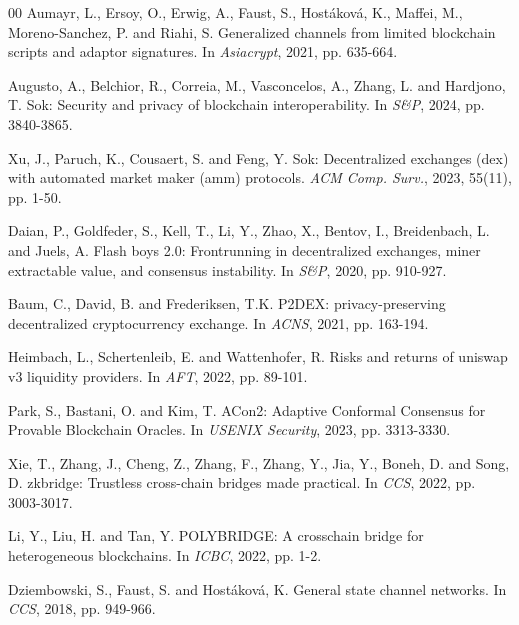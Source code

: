 \documentclass[runningheads]{llncs}
\begin{document}
\begin{thebibliography}{00}
Aumayr, L., Ersoy, O., Erwig, A., Faust, S., Hostáková, K., Maffei, M., Moreno-Sanchez, P. and Riahi, S. Generalized channels from limited blockchain scripts and adaptor signatures. In \textit{Asiacrypt}, 2021, pp. 635-664.

Augusto, A., Belchior, R., Correia, M., Vasconcelos, A., Zhang, L. and Hardjono, T. Sok: Security and privacy of blockchain interoperability. In \textit{S\&P}, 2024, pp. 3840-3865.



Xu, J., Paruch, K., Cousaert, S. and Feng, Y. Sok: Decentralized exchanges (dex) with automated market maker (amm) protocols. \textit{ACM Comp. Surv.}, 2023, 55(11), pp. 1-50.

Daian, P., Goldfeder, S., Kell, T., Li, Y., Zhao, X., Bentov, I., Breidenbach, L. and Juels, A. Flash boys 2.0: Frontrunning in decentralized exchanges, miner extractable value, and consensus instability. In \textit{S\&P}, 2020, pp. 910-927.

Baum, C., David, B. and Frederiksen, T.K. P2DEX: privacy-preserving decentralized cryptocurrency exchange. In \textit{ACNS}, 2021, pp. 163-194.

Heimbach, L., Schertenleib, E. and Wattenhofer, R. Risks and returns of uniswap v3 liquidity providers. In \textit{AFT}, 2022, pp. 89-101.



Park, S., Bastani, O. and Kim, T. ACon2: Adaptive Conformal Consensus for Provable Blockchain Oracles. In \textit{USENIX Security}, 2023, pp. 3313-3330.


Xie, T., Zhang, J., Cheng, Z., Zhang, F., Zhang, Y., Jia, Y., Boneh, D. and Song, D. zkbridge: Trustless cross-chain bridges made practical. In \textit{CCS}, 2022, pp. 3003-3017.

Li, Y., Liu, H. and Tan, Y. POLYBRIDGE: A crosschain bridge for heterogeneous blockchains. In \textit{ICBC}, 2022, pp. 1-2.


Dziembowski, S., Faust, S. and Hostáková, K. General state channel networks. In \textit{CCS}, 2018, pp. 949-966.


\end{thebibliography}
\end{document}

